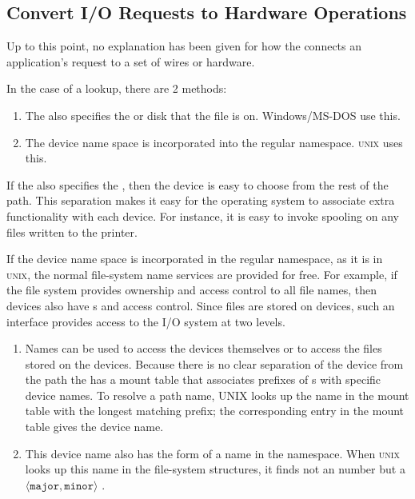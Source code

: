 \subsection{Convert I/O Requests to Hardware Operations}\label{subsec:Convert_IO_Requests_HW_Ops}
Up to this point, no explanation has been given for how the  connects an application's request to a set of wires or hardware.

In the case of a  lookup, there are 2 methods:
\begin{enumerate}[noitemsep]
\item The  also specifies the  or disk that the file is on.
  Windows/MS-DOS use this.
\item The device name space is incorporated into the regular  namespace.
  \textsc{unix} uses this.
\end{enumerate}

If the  also specifies the , then the device is easy to choose from the rest of the path.
This separation makes it easy for the operating system to associate extra functionality with each device.
For instance, it is easy to invoke spooling on any files written to the printer.

If the device name space is incorporated in the regular  namespace, as it is in \textsc{unix}, the normal file-system name services are provided for free.
For example, if the file system provides ownership and access control to all file names, then devices also have s and access control.
Since files are stored on devices, such an interface provides access to the I/O system at two levels.

\begin{enumerate}[noitemsep]
\item Names can be used to access the devices themselves or to access the files stored on the devices.
  Because there is no clear   separation of the device from the path the  has a mount table that associates prefixes of s with specific device names.
  To resolve a path name, UNIX looks up the name in the mount table with the longest matching prefix; the corresponding entry in the mount table gives the device name.

\item This device name also has the form of a name in the  namespace.
  When \textsc{unix} looks up this name in the file-system  structures, it finds not an  number but a $\langle \mathtt{major}, \mathtt{minor} \rangle$ .
\end{enumerate}

